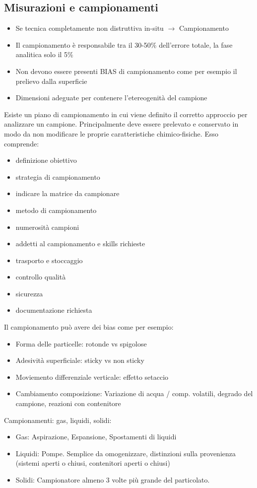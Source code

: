 \documentclass{article}
\begin{document}
\subsection{Misurazioni e campionamenti}
\begin{itemize}
	\item Se tecnica completamente non distruttiva in-situ $\rightarrow$ Campionamento
	\item Il campionamento è responsabile tra il 30-50\% dell'errore totale, la fase analitica solo il 5\%
	\item Non devono essere presenti BIAS di campionamento come per esempio il prelievo dalla superficie
	\item Dimensioni adeguate per contenere l'etereogenità del campione
\end{itemize}
%
Esiste un piano di campionamento in cui viene definito il corretto approccio per analizzare un campione. Principalmente deve essere prelevato e conservato in modo da non modificare le proprie caratteristiche chimico-fisiche. Esso comprende:
\begin{itemize}
	\item definizione obiettivo
	\item strategia di campionamento
	\item indicare la matrice da campionare
	\item metodo di campionamento
	\item numerosità campioni
	\item addetti al campionamento e skills richieste
	\item trasporto e stoccaggio
	\item controllo qualità
	\item sicurezza
	\item documentazione richiesta
\end{itemize}
%
Il campionamento può avere dei bias come per esempio:
\begin{itemize}
	\item Forma delle particelle: rotonde vs spigolose
	\item Adesività superficiale: sticky vs non sticky
	\item Moviemento differenziale verticale: effetto setaccio
	\item Cambiamento composizione: Variazione di acqua / comp. volatili, degrado del campione, reazioni con contenitore 
\end{itemize}
%
Campionamenti: gas, liquidi, solidi:
\begin{itemize}
	\item Gas: Aspirazione, Espansione, Spostamenti di liquidi
	\item Liquidi: Pompe. Semplice da omogenizzare, distinzioni sulla provenienza (sistemi aperti o chiusi, contenitori aperti o chiusi)
	\item Solidi: Campionatore almeno 3 volte più grande del particolato.
\end{itemize}
\end{document}
